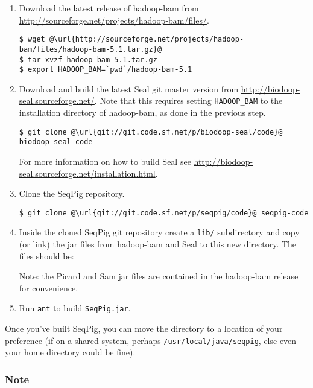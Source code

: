 \begin{enumerate}
\item Download the latest release of hadoop-bam from \url{http://sourceforge.net/projects/hadoop-bam/files/}.
\begin{lstlisting} 
$ wget @\url{http://sourceforge.net/projects/hadoop-bam/files/hadoop-bam-5.1.tar.gz}@
$ tar xvzf hadoop-bam-5.1.tar.gz
$ export HADOOP_BAM=`pwd`/hadoop-bam-5.1
\end{lstlisting}
\item Download and build the latest Seal git master version from
 \url{http://biodoop-seal.sourceforge.net/}. Note that this requires setting
 {\tt HADOOP\_BAM} to the installation directory of hadoop-bam, as done in the previous step.
\begin{lstlisting} 
$ git clone @\url{git://git.code.sf.net/p/biodoop-seal/code}@ biodoop-seal-code
\end{lstlisting}
For more information on how to build Seal see \url{http://biodoop-seal.sourceforge.net/installation.html}.
\item Clone the SeqPig repository.
\begin{lstlisting} 
$ git clone @\url{git://git.code.sf.net/p/seqpig/code}@ seqpig-code
\end{lstlisting}
\item Inside the cloned SeqPig git repository create a
{\tt lib/} subdirectory and copy (or link) the jar files
from hadoop-bam and Seal to this new directory.  The files should be:
%
Note: the Picard and Sam jar files are contained in the hadoop-bam release
for convenience.
\item Run {\tt ant} to build {\tt SeqPig.jar}.
\end{enumerate}

Once you've built SeqPig, you can move the directory to a location of your
preference (if on a shared system, perhaps {\tt /usr/local/java/seqpig}, else
even your home directory could be fine).

\subsubsection{Note}
\label{sect:piggybank_note}

